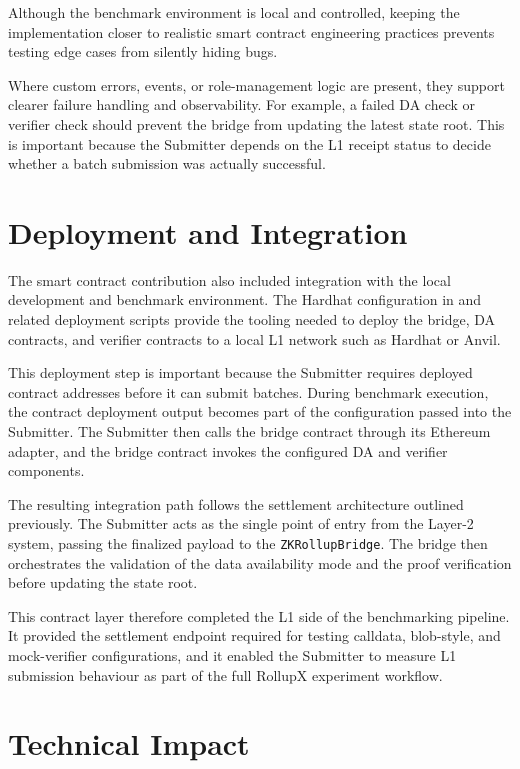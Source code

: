 Although the benchmark environment is local and controlled, keeping the implementation closer to realistic smart contract engineering practices prevents testing edge cases from silently hiding bugs.

Where custom errors, events, or role-management logic are present, they support clearer failure handling and observability. For example, a failed DA check or verifier check should prevent the bridge from updating the latest state root. This is important because the Submitter depends on the L1 receipt status to decide whether a batch submission was actually successful.

\section{Deployment and Integration}

The smart contract contribution also included integration with the local development and benchmark environment. The Hardhat configuration in  and related deployment scripts provide the tooling needed to deploy the bridge, DA contracts, and verifier contracts to a local L1 network such as Hardhat or Anvil.

This deployment step is important because the Submitter requires deployed contract addresses before it can submit batches. During benchmark execution, the contract deployment output becomes part of the configuration passed into the Submitter. The Submitter then calls the bridge contract through its Ethereum adapter, and the bridge contract invokes the configured DA and verifier components.

The resulting integration path follows the settlement architecture outlined previously. The Submitter acts as the single point of entry from the Layer-2 system, passing the finalized payload to the \texttt{ZKRollupBridge}. The bridge then orchestrates the validation of the data availability mode and the proof verification before updating the state root.

This contract layer therefore completed the L1 side of the benchmarking pipeline. It provided the settlement endpoint required for testing calldata, blob-style, and mock-verifier configurations, and it enabled the Submitter to measure L1 submission behaviour as part of the full RollupX experiment workflow.

\section{Technical Impact}

